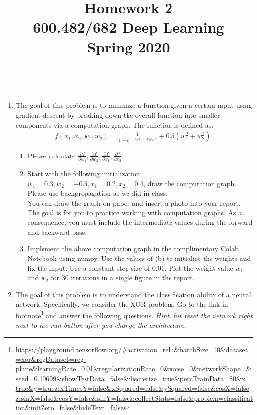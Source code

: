\documentclass[a4paper]{article}
\title{Homework 2\\
600.482/682 Deep Learning\\
Spring 2020}
\begin{document}
\maketitle

\\

\vspace{5mm}

\begin{enumerate}
\item The goal of this problem is to minimize a function given a certain input using gradient descent by breaking down the overall function into smaller components via a computation graph. The function is defined as:
\begin{align*}
f(x_1, x_2, w_1, w_2) = \frac{1}{1+e^{-(w_1 x_1+w_2 x_2)}} + 0.5(w_1^2 + w_2^2)\,.
\end{align*}
\begin{enumerate}
\item Please calculate $\frac{\partial f}{\partial w_1}, \frac{\partial f}{\partial w_2}, \frac{\partial f}{\partial x_1}, \frac{\partial f}{\partial x_2}$.
\item Start with the following initialization: $w_1 = 0.3, w_2 = -0.5, x_1 = 0.2, x_2 = 0.4$, draw the computation graph. Please use backpropagation as we did in class.\\
You can draw the graph on paper and insert a photo into your report.\\
The goal is for you to practice working with computation graphs. As a consequence, you must include the intermediate values during the forward and backward pass.
\item Implement the above computation graph in the complimentary Colab Notebook using numpy. Use the values of (b) to initialize the weights and fix the input. Use a constant step size of 0.01. Plot the weight value $w_1$ and $w_2$ for 30 iterations in a single figure in the report.
\end{enumerate}


\item The goal of this problem is to understand the classification ability of a neural network. Specifically, we consider the XOR problem. Go to the link in footnote\footnote{\url{https://playground.tensorflow.org/#activation=relu&batchSize=10&dataset=xor&regDataset=reg-plane&learningRate=0.01&regularizationRate=0&noise=0&networkShape=&seed=0.10699&showTestData=false&discretize=true&percTrainData=80&x=true&y=true&xTimesY=false&xSquared=false&ySquared=false&cosX=false&sinX=false&cosY=false&sinY=false&collectStats=false&problem=classification&initZero=false&hideText=false}} and answer the following questions. \textit{Hint: hit reset the network right next to the run button after you change the architecture.}


\end{enumerate}
\end{document}
